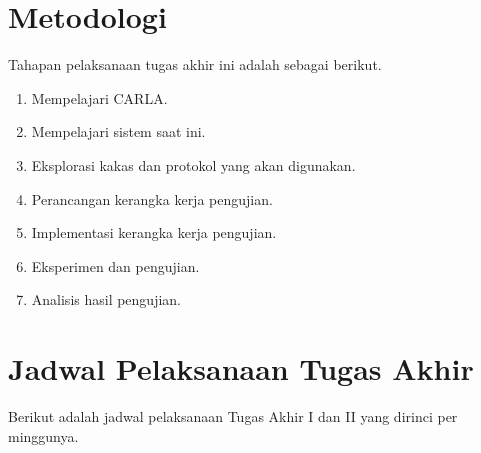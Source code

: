 \section{Metodologi}


Tahapan pelaksanaan tugas akhir ini adalah sebagai berikut.

\begin{enumerate}
	\item Mempelajari CARLA.
	\item Mempelajari sistem saat ini.
	\item Eksplorasi kakas dan protokol yang akan digunakan.
	\item Perancangan kerangka kerja pengujian.
	\item Implementasi kerangka kerja pengujian.
	\item Eksperimen dan pengujian.
	\item Analisis hasil pengujian.
\end{enumerate}

\section{Jadwal Pelaksanaan Tugas Akhir}


Berikut adalah jadwal pelaksanaan Tugas Akhir I dan II yang dirinci per minggunya.

